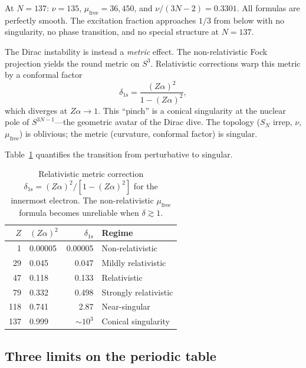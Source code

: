 \documentclass[aps,prl,twocolumn,superscriptaddress,longbibliography]{revtex4-2}
\newcommand{\mufree}{\mu_{\mathrm{free}}}
\begin{document}
At $N = 137$: $\nu = 135$, $\mufree = 36{,}450$, and $\nu/(3N-2) =
0.3301$.  All formulas are perfectly smooth.  The excitation fraction
approaches $1/3$ from below with no singularity, no phase transition,
and no special structure at $N = 137$.

The Dirac instability is instead a \emph{metric} effect.  The
non-relativistic Fock projection yields the round metric on $S^3$.
Relativistic corrections warp this metric by a conformal factor
\begin{equation}
  \delta_{\mathrm{1s}} = \frac{(Z\alpha)^2}{1 - (Z\alpha)^2},
  \label{eq:metric_correction}
\end{equation}
which diverges at $Z\alpha \to 1$.  This ``pinch'' is a conical
singularity at the nuclear pole of $S^{3N-1}$---the geometric avatar
of the Dirac dive.  The topology ($S_N$ irrep, $\nu$, $\mufree$)
is oblivious; the metric (curvature, conformal factor) is singular.

Table~\ref{tab:metric} quantifies the transition from perturbative
to singular.

\begin{table}[h]
\centering
\caption{Relativistic metric correction $\delta_{1\mathrm{s}} =
(Z\alpha)^2/[1 - (Z\alpha)^2]$ for the innermost electron.  The
non-relativistic $\mufree$ formula becomes unreliable when
$\delta \gtrsim 1$.}
\label{tab:metric}
\begin{tabular}{rlrl}
\toprule
$Z$ & $(Z\alpha)^2$ & $\delta_{1\mathrm{s}}$ & Regime \\
\midrule
  1 & 0.00005 & 0.00005 & Non-relativistic \\
 29 & 0.045   & 0.047   & Mildly relativistic \\
 47 & 0.118   & 0.133   & Relativistic \\
 79 & 0.332   & 0.498   & Strongly relativistic \\
118 & 0.741   & 2.87    & Near-singular \\
137 & 0.999   & $\sim 10^3$ & Conical singularity \\
\bottomrule
\end{tabular}
\end{table}

\subsection{Three limits on the periodic table}
\end{document}
